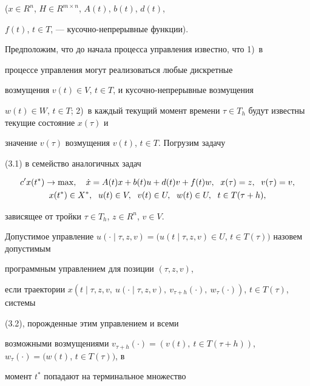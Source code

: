 ($x \in R^n$, $H \in R^{m \times n}$, $A(t)$, $b(t)$, $d(t)$,


$f(t)$, $t \in T$, --- кусочно-непрерывные функции).





Предположим, что до начала процесса управления известно, что 1)~в


процессе управления могут реализоваться любые дискретные


возмущения $v(t) \in V$, $t \in T$, и кусочно-непрерывные возмущения


$w(t) \in W$, $t \in T$; 2)~в каждый текущий момент времени $\tau


\in T_{h}$ будут известны текущие состояние $x(\tau)$ и


значение $v(\tau)$ возмущения $v(t)$, $t \in T$. Погрузим задачу


(3.1) в семейство аналогичных задач


\begin{gather}


c'x(t^*)\rightarrow \max,\quad \Dot x = A(t) x+b(t)u+d(t)v+f(t)w,


\ \; x(\tau)=z,\ \; v(\tau)=v, \\


%


x(t^*) \in X^*,\ \; u(t) \in V,\ \; v(t)\in U,


\ \; w(t) \in U,\ \; t \in T(\tau+h),\notag


\end{gather}


зависящее от тройки $\tau \in T_{h}$, $z \in R^n$, $v \in V$.





Допустимое управление $u(\cdot\mid\tau,z,v)=(u(t\mid\tau,z,v)


\in U$, $t \in T(\tau))$ назовем допустимым


программным управлением для позиции $(\tau,z,v)$,


если траектории $x(t\mid\tau,z,v,\ u(\cdot\mid\tau,z,v),


\ v_{\tau+h}(\cdot),\ w_{\tau}(\cdot))$, $t \in T(\tau)$, системы


(3.2), порожденные этим управлением и всеми


возможными возмущениями $v_{\tau+h}(\cdot)=(v(t),\ t


\in T(\tau+h))$, $w_{\tau}(\cdot)=(w(t)$, $t \in T(\tau))$, в


момент $t^*$ попадают на терминальное множество


